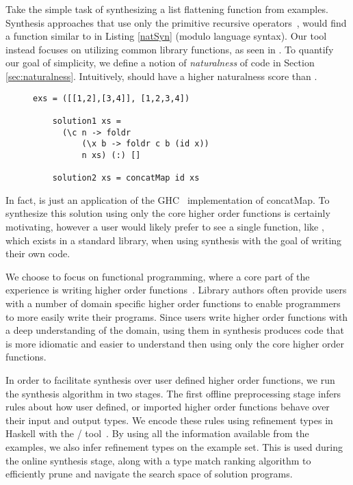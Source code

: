 Take the simple task of synthesizing a list flattening function from examples.
Synthesis approaches that use only the primitive recursive operators~\cite{Osera:2015,FeserCD15}, would find a function similar to  in Listing \ref{natSyn} (modulo language syntax).
Our tool instead focuses on utilizing common library functions, as seen in .
To quantify our goal of simplicity, we define a notion of \textit{naturalness} of code in Section \ref{sec:naturalness}.
Intuitively,  should have a higher naturalness score than .


\begin{figure}
  \begin{lstlisting}[caption=Low-level synthesis vs. Natural synthesis,label=natSyn]
    exs = ([[1,2],[3,4]], [1,2,3,4])

    solution1 xs =
      (\c n -> foldr
          (\x b -> foldr c b (id x))
          n xs) (:) []

    solution2 xs = concatMap id xs
    \end{lstlisting}
\end{figure}

\noindent In fact,  is just an application of the GHC~\cite{ghc} implementation of concatMap.
To synthesize this solution using only the core higher order functions is certainly motivating, however a user would likely prefer to see a single function, like , which exists in a standard library, when using synthesis with the goal of writing their own code.

We choose to focus on functional programming, where a core part of the experience is writing higher order functions~\cite{Lipovaca:2011}.
Library authors often provide users with a number of domain specific higher order functions to enable programmers to more easily write their programs.
Since users write higher order functions with a deep understanding of the domain, using them in synthesis produces code that is more idiomatic and easier to understand then using only the core higher order functions.

In order to facilitate synthesis over user defined higher order functions, we run the synthesis algorithm in two stages.
The first offline preprocessing stage infers rules about how user defined, or imported higher order functions behave over their input and output types.
We encode these rules using refinement types in Haskell with the \lhask/ tool~\cite{DBLP:conf/haskell/VazouSJ14}.
By using all the information available from the examples, we also infer refinement types on the example set. 
This is used during the online synthesis stage, along with a type match ranking algorithm to efficiently prune and navigate the search space of solution programs.


